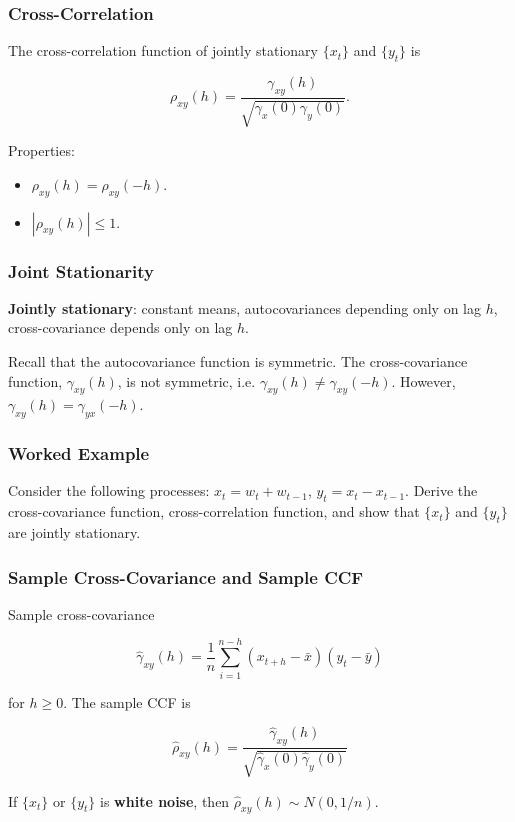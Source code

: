 \documentclass[%
xcolor=pdftex]{beamer}
\begin{document}
\begin{frame}
\frametitle{Cross-Correlation}

The cross-correlation function of jointly stationary $\{x_t\}$ and $\{y_t\}$ is

\begin{equation} \label{eq:cor}
\rho_{xy}(h) = \frac{\gamma_{xy}(h)}{\sqrt{\gamma_x(0) \gamma_y(0)}}.
\end{equation}

Properties:
\begin{itemize}
\item $\rho_{xy}(h) = \rho_{xy}(-h)$.
\item $|\rho_{xy}(h)| \leq 1$.
\end{itemize}

\end{frame}

\begin{frame}
\frametitle{Joint Stationarity}

\textbf{Jointly stationary}: constant means, autocovariances depending only on lag $h$, cross-covariance depends only on lag $h$.\\

\vspace{5mm}

Recall that the autocovariance function is symmetric. The cross-covariance function, $\gamma_{xy}(h)$, is not symmetric, i.e. $\gamma_{xy}(h) \neq \gamma_{xy}(-h)$. However, $\gamma_{xy}(h) = \gamma_{yx}(-h)$.

\end{frame}

\begin{frame}
\frametitle{Worked Example}

Consider the following processes: $x_t = w_t + w_{t-1}$, $y_t = x_t - x_{t-1}$. Derive the cross-covariance function, cross-correlation function, and show that $\{x_t\}$ and $\{y_t\}$ are jointly stationary.\\

\vspace{50mm}

\end{frame}

\begin{frame}
\frametitle{Sample Cross-Covariance and Sample CCF}

Sample cross-covariance

\begin{equation*}
\hat{\gamma}_{xy}(h) = \frac{1}{n} \sum_{i=1}^{n-h} (x_{t+h} - \bar{x}) (y_{t} - \bar{y})
\end{equation*}

for $h \geq 0$. The sample CCF is

\begin{equation*}
\hat{\rho}_{xy}(h) = \frac{\hat{\gamma}_{xy}(h)}{\sqrt{\hat{\gamma}_{x}(0) \hat{\gamma}_{y}(0) }}
\end{equation*}

If $\{x_t\}$ or $\{y_t\}$ is \textbf{white noise}, then $\hat{\rho}_{xy}(h) \sim N(0, 1/n)$.

\end{frame}
\end{document}
